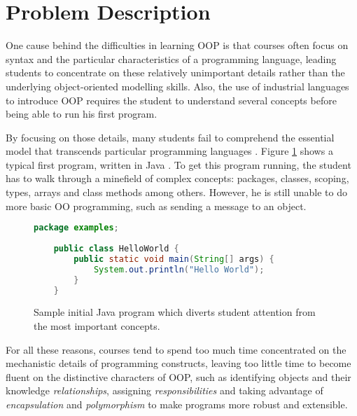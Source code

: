 \section{Problem Description}
\label{sec:problem}


One cause behind the difficulties in learning OOP is that courses often focus on syntax and the particular characteristics of a
programming language, leading students to concentrate on these relatively unimportant details rather than the underlying object-oriented modelling skills. 
Also, the use of industrial languages to introduce OOP requires the student to understand several concepts before being able to run his first program. \cite{kolling_problem_1999}

By focusing on those details, many students fail to comprehend the essential model that transcends particular programming languages \cite{the_joint_task_force_on_computing_curricula_computing_2001}. 
Figure \ref{fig:helloWorld} shows a typical first program, written in Java \cite{arnold_java_1996}.
To get this program running, the student has to walk through a minefield of complex concepts: packages, classes, scoping, types, arrays and class methods among others.
However, he is still unable to do more basic OO programming, such as sending a message to an object.

\begin{figure}[ht]
 \centering
 \begin{lstlisting}[language=Java]
	package examples;
	
	public class HelloWorld {
		public static void main(String[] args) {
			System.out.println("Hello World");
		}
	}
 \end{lstlisting}
 
 \caption{\small Sample initial Java program which diverts student attention from the most important concepts.}
 \label{fig:helloWorld}
\end{figure}

For all these reasons, courses tend to spend too much time concentrated on the mechanistic details of programming constructs, 
leaving too little time to become fluent on the distinctive characters of OOP, 
such as identifying objects and their knowledge \emph{relationships}, assigning \emph{responsibilities} 
and taking advantage of \emph{encapsulation} and \emph{polymorphism} to make programs more robust and extensible.

